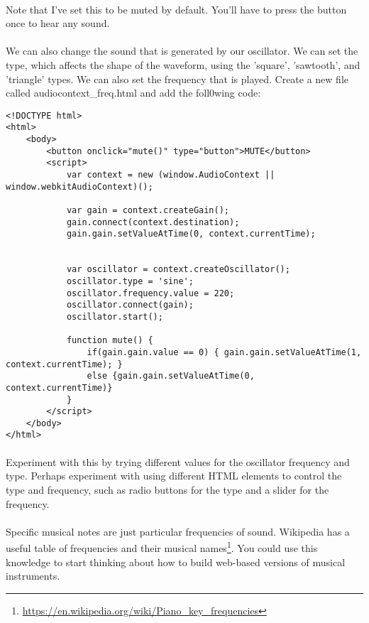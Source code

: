 \documentclass[10pt, a4paper]{article}
\begin{document}
\paragraph{} Note that I've set this to be muted by default. You'll have to press the button once to hear any sound.

\paragraph{} We can also change the sound that is generated by our oscillator. We can set the type, which affects the shape of the waveform, using the 'square', 'sawtooth', and 'triangle' types. We can also set the frequency that is played. Create a new file called audiocontext\_freq.html and add the foll0wing code:

\begin{lstlisting}
<!DOCTYPE html>
<html>
    <body>
        <button onclick="mute()" type="button">MUTE</button>
        <script>
            var context = new (window.AudioContext || window.webkitAudioContext)();

            var gain = context.createGain();
            gain.connect(context.destination);
            gain.gain.setValueAtTime(0, context.currentTime);


            var oscillator = context.createOscillator();
            oscillator.type = 'sine';
            oscillator.frequency.value = 220;
            oscillator.connect(gain);
            oscillator.start();

            function mute() {
                if(gain.gain.value == 0) { gain.gain.setValueAtTime(1, context.currentTime); }
                else {gain.gain.setValueAtTime(0, context.currentTime)}
            }
        </script>
    </body>
</html>
\end{lstlisting}

\paragraph{} Experiment with this by trying different values for the oscillator frequency and type. Perhaps experiment with using different HTML elements to control the type and frequency, such as radio buttons for the type and a slider for the frequency.

\paragraph{} Specific musical notes are just particular frequencies of sound. Wikipedia has a useful table of frequencies and their musical names\footnote{\url{https://en.wikipedia.org/wiki/Piano_key_frequencies}}. You could use this knowledge to start thinking about how to build web-based versions of musical instruments. 
\end{document}
